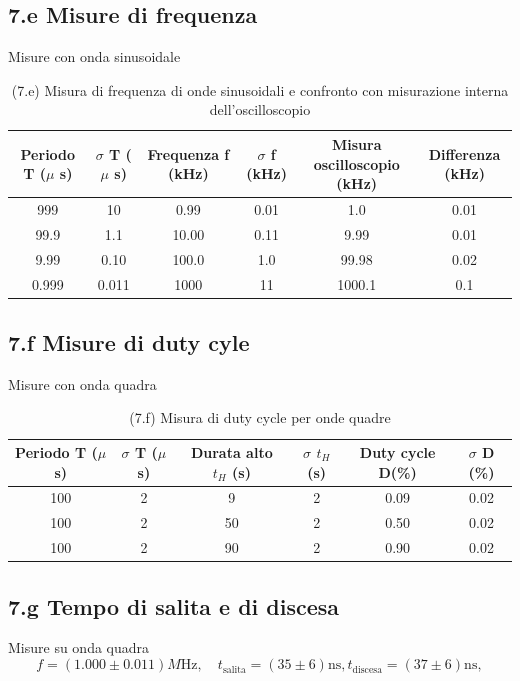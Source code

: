 \documentclass[10pt,a4paper]{article}
\begin{document}
\subsection*{7.e Misure di frequenza}
Misure con onda sinusoidale
\begin{table}[h]
\centering
\begin{tabular}{|c|c|c|c|c|c|}
\hline 
Periodo T ($\mu$ s)& $\sigma$ T ($\mu$ s) &Frequenza f (kHz) & $\sigma$ f (kHz) &
Misura oscilloscopio (kHz) & Differenza (kHz)\\
\hline 
999 & 10 & 0.99 & 0.01 & 1.0 & 0.01 \\
99.9 & 1.1 & 10.00 & 0.11 & 9.99 & 0.01 \\
9.99 & 0.10 & 100.0 & 1.0 & 99.98 & 0.02 \\
0.999 & 0.011 & 1000 & 11 & 1000.1 & 0.1 \\
\hline 
\end{tabular} 
\caption{(7.e) Misura di frequenza di onde sinusoidali e confronto con
misurazione interna dell'oscilloscopio }
\end{table}

\subsection*{7.f Misure di duty cyle}
Misure con onda quadra
\begin{table}[h]
\centering
\begin{tabular}{|c|c|c|c|c|c|}
\hline 
Periodo T ($\mu$ s)& $\sigma$ T ($\mu$ s) & Durata alto $t_H$ (s) & $\sigma$ $t_H$ (s)
& Duty cycle D(\%) & $\sigma$ D (\%) \\
\hline 
100 & 2 & 9 & 2 & 0.09 & 0.02 \\
100 & 2 & 50 & 2 & 0.50 & 0.02 \\
100 & 2 & 90 & 2 & 0.90 & 0.02 \\
\hline 
\end{tabular} 
\caption{(7.f) Misura di duty cycle per onde quadre }
\end{table}


\subsection*{7.g Tempo di salita e di discesa}
Misure su onda quadra
\[
f = (1.000 \pm 0.011) \si{M\Hz}, \quad
t_\mathrm{salita} = (35 \pm 6) \mathrm{ns},
t_\mathrm{discesa} = (37 \pm 6) \mathrm{ns},
\]
\end{document}

